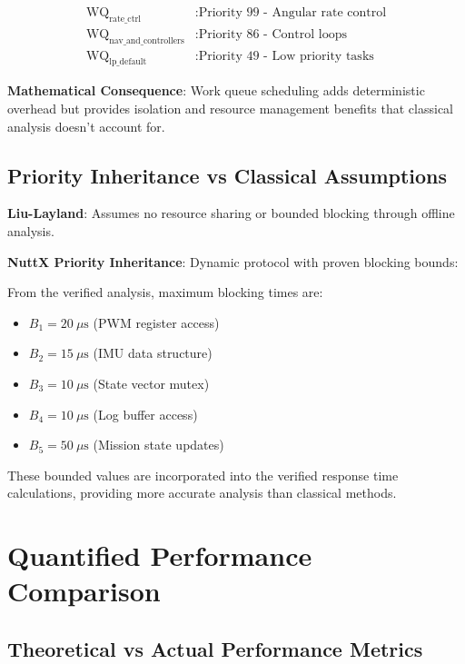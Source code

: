 \documentclass[12pt,a4paper]{article}
\begin{document}
\begin{align}
\text{WQ}_{\text{rate\_ctrl}} &: \text{Priority 99 - Angular rate control} \\
\text{WQ}_{\text{nav\_and\_controllers}} &: \text{Priority 86 - Control loops} \\
\text{WQ}_{\text{lp\_default}} &: \text{Priority 49 - Low priority tasks}
\end{align}

\textbf{Mathematical Consequence}: Work queue scheduling adds deterministic overhead but provides isolation and resource management benefits that classical analysis doesn't account for.

\subsection{Priority Inheritance vs Classical Assumptions}

\textbf{Liu-Layland}: Assumes no resource sharing or bounded blocking through offline analysis.

\textbf{NuttX Priority Inheritance}: Dynamic protocol with proven blocking bounds:

From the verified analysis, maximum blocking times are:
\begin{itemize}
\item $B_1 = 20\ \mu\text{s}$ (PWM register access)
\item $B_2 = 15\ \mu\text{s}$ (IMU data structure)
\item $B_3 = 10\ \mu\text{s}$ (State vector mutex)
\item $B_4 = 10\ \mu\text{s}$ (Log buffer access)
\item $B_5 = 50\ \mu\text{s}$ (Mission state updates)
\end{itemize}

These bounded values are incorporated into the verified response time calculations, providing more accurate analysis than classical methods.

\section{Quantified Performance Comparison}

\subsection{Theoretical vs Actual Performance Metrics}
\end{document}
